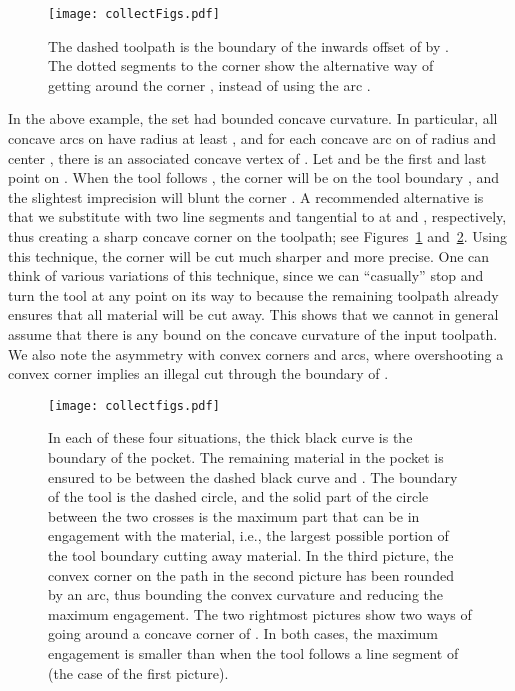 \documentclass{article}
\begin{document}
\begin{figure}
\centering
\texttt{[image: collectFigs.pdf]}
\caption{
The dashed toolpath  is the boundary of the inwards offset of
 by . The dotted segments to the corner 
show the alternative way of getting around the corner , instead of using the arc .}
\label{heartExFig}
\end{figure}

\noindent
In the above example, the set  had bounded concave curvature. In
particular, all concave arcs on  have radius at least ,
and for each concave arc  on  of radius
 and center , there is an associated concave vertex  of
. Let  and  be the first and last point on
. When the tool follows , the corner  will be on the
tool boundary , and the slightest imprecision will
blunt the corner . A recommended alternative
\cite{park2003mitered} is that we substitute  with two line
segments  and  tangential to  at  and ,
respectively, thus creating a sharp concave corner  on the
toolpath; see Figures~\ref{heartExFig} and~\ref{cuttingCloseups}. Using this technique, the
corner  will be cut much sharper and more precise. One can think of
various variations of this technique, since we can ``casually'' stop
and turn the tool at any point on its way to  because the remaining
toolpath already ensures that all material will be cut away.  This
shows that we cannot in general assume that there is any bound on the
concave curvature of the input toolpath. We also note the asymmetry with
convex corners and arcs, where overshooting a convex corner implies an
illegal cut through the boundary of .

\begin{figure}
\centering
\texttt{[image: collectfigs.pdf]}
\caption{In each of these four situations, the thick black curve is the boundary  of the pocket.
The remaining material in the pocket is ensured to be between the dashed black curve and .
The boundary of the tool  is the dashed circle, and the solid part of the circle between the two crosses is the maximum part that can be in engagement with the material, i.e., the largest possible portion of the tool boundary cutting away material.
In the third picture, the convex corner on the path in the second picture has been rounded by an arc, thus bounding the convex curvature and reducing the maximum engagement.
The two rightmost pictures show two ways of going around a concave corner of .
In both cases, the maximum engagement is smaller than when the tool
follows a line segment of  (the case of the first picture).}
\label{cuttingCloseups}
\end{figure}
\end{document}
